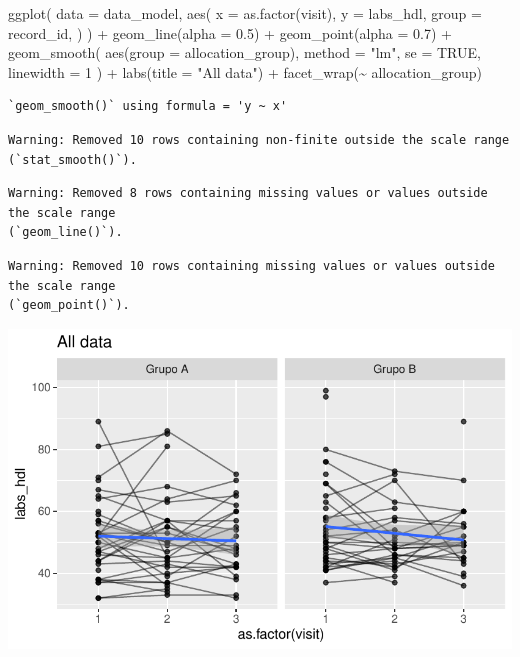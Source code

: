 \documentclass[
  letterpaper,
  DIV=11,
  numbers=noendperiod]{scrartcl}
\newenvironment{Shaded}{\begin{snugshade}}{\end{snugshade}}
\newcommand{\AttributeTok}[1]{\textcolor[rgb]{0.40,0.45,0.13}{#1}}
\newcommand{\ConstantTok}[1]{\textcolor[rgb]{0.56,0.35,0.01}{#1}}
\newcommand{\DecValTok}[1]{\textcolor[rgb]{0.68,0.00,0.00}{#1}}
\newcommand{\FloatTok}[1]{\textcolor[rgb]{0.68,0.00,0.00}{#1}}
\newcommand{\FunctionTok}[1]{\textcolor[rgb]{0.28,0.35,0.67}{#1}}
\newcommand{\NormalTok}[1]{\textcolor[rgb]{0.00,0.23,0.31}{#1}}
\newcommand{\SpecialCharTok}[1]{\textcolor[rgb]{0.37,0.37,0.37}{#1}}
\newcommand{\StringTok}[1]{\textcolor[rgb]{0.13,0.47,0.30}{#1}}
\begin{document}
\begin{Shaded}
\begin{Highlighting}[]
\FunctionTok{ggplot}\NormalTok{(}
    \AttributeTok{data =}\NormalTok{ data\_model, }
    \FunctionTok{aes}\NormalTok{(}
        \AttributeTok{x =} \FunctionTok{as.factor}\NormalTok{(visit),}
        \AttributeTok{y =}\NormalTok{ labs\_hdl,}
        \AttributeTok{group =}\NormalTok{ record\_id,}
\NormalTok{    )}
\NormalTok{) }\SpecialCharTok{+}
    \FunctionTok{geom\_line}\NormalTok{(}\AttributeTok{alpha =} \FloatTok{0.5}\NormalTok{) }\SpecialCharTok{+}
    \FunctionTok{geom\_point}\NormalTok{(}\AttributeTok{alpha =} \FloatTok{0.7}\NormalTok{) }\SpecialCharTok{+}
    \FunctionTok{geom\_smooth}\NormalTok{(}
        \FunctionTok{aes}\NormalTok{(}\AttributeTok{group =}\NormalTok{ allocation\_group),}
        \AttributeTok{method =} \StringTok{"lm"}\NormalTok{,}
        \AttributeTok{se =} \ConstantTok{TRUE}\NormalTok{,}
        \AttributeTok{linewidth =} \DecValTok{1}
\NormalTok{    ) }\SpecialCharTok{+}
    \FunctionTok{labs}\NormalTok{(}\AttributeTok{title =} \StringTok{"All data"}\NormalTok{) }\SpecialCharTok{+}
    \FunctionTok{facet\_wrap}\NormalTok{(}\SpecialCharTok{\textasciitilde{}}\NormalTok{ allocation\_group) }
\end{Highlighting}
\end{Shaded}

\begin{verbatim}
`geom_smooth()` using formula = 'y ~ x'
\end{verbatim}

\begin{verbatim}
Warning: Removed 10 rows containing non-finite outside the scale range
(`stat_smooth()`).
\end{verbatim}

\begin{verbatim}
Warning: Removed 8 rows containing missing values or values outside the scale range
(`geom_line()`).
\end{verbatim}

\begin{verbatim}
Warning: Removed 10 rows containing missing values or values outside the scale range
(`geom_point()`).
\end{verbatim}

\includegraphics{Outcomes_V1V2V3_files/figure-pdf/labs_hdl_6-1.pdf}
\end{document}
